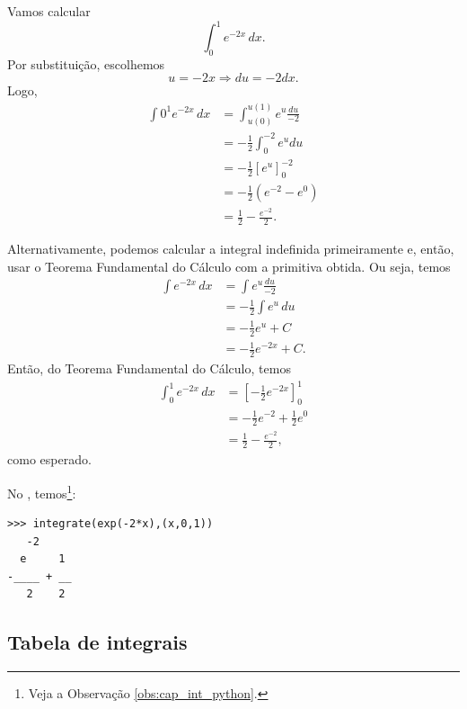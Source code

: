 \begin{ex}
  Vamos calcular
  \begin{equation}
    \int_0^1 e^{-2x}\,dx.
  \end{equation}
  Por substituição, escolhemos
  \begin{equation}
    u = -2x \Rightarrow du = -2dx.
  \end{equation}
  Logo,
  \begin{align}
    \int 0^1 e^{-2x}\,dx &= \int_{u(0)}^{u(1)} e^{u}\frac{du}{-2} \\
                         &= -\frac{1}{2}\int_{0}^{-2} e^udu \\
                         &= -\frac{1}{2}\left[e^u\right]_0^{-2} \\
                         &= -\frac{1}{2}\left(e^{-2} - e^0\right) \\
                         &= \frac{1}{2} - \frac{e^{-2}}{2}.
  \end{align}

  Alternativamente, podemos calcular a integral indefinida primeiramente e, então, usar o Teorema Fundamental do Cálculo com a primitiva obtida. Ou seja, temos
  \begin{align}
    \int e^{-2x}\,dx &= \int e^u\frac{du}{-2} \\
                     &= -\frac{1}{2}\int e^u\,du \\
                     &= -\frac{1}{2}e^u + C \\
                     &= -\frac{1}{2}e^{-2x} + C.
  \end{align}
  Então, do Teorema Fundamental do Cálculo, temos
  \begin{align}
    \int_0^1 e^{-2x}\,dx &= \left[-\frac{1}{2}e^{-2x}\right]_0^1 \\
                         &= -\frac{1}{2}e^{-2} + \frac{1}{2}e^{0} \\
                         &= \frac{1}{2} - \frac{e^{-2}}{2},
  \end{align}
  como esperado.

\ifispython
No \sympy, temos\footnote{Veja a Observação \ref{obs:cap_int_python}.}:
\begin{verbatim}
>>> integrate(exp(-2*x),(x,0,1))
   -2    
  e     1
-____ + __
   2    2
\end{verbatim}
\fi      
\end{ex}

\subsection{Tabela de integrais}

